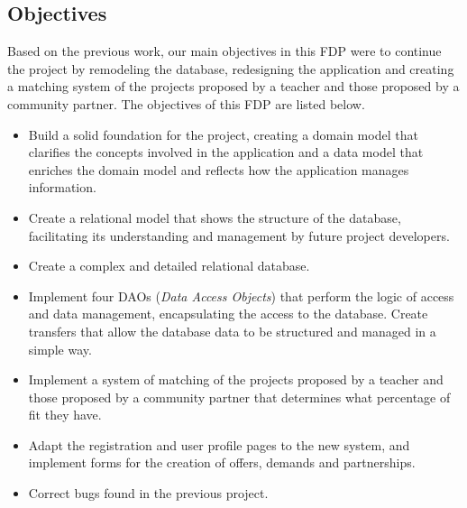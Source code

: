 \documentclass[11pt]{book}
\begin{document}
\begin{itemize}
\section{Objectives}
Based on the previous work, our main objectives in this FDP were to continue the project by remodeling the database, redesigning the application and creating a matching system of the projects proposed by a teacher and those proposed by a community partner.
The objectives of this FDP are listed below.
\begin{itemize} 
	\item Build a solid foundation for the project, creating a domain model that clarifies the concepts involved in the application and a data model that enriches the domain model and reflects how the application manages information.
	\item Create a relational model that shows the structure of the database, facilitating its understanding and management by future project developers.
	\item Create a complex and detailed relational database.
	\item Implement four DAOs (\emph{Data Access Objects}) that perform the logic of access and data management, encapsulating the access to the database. Create transfers that allow the database data to be structured and managed in a simple way.
	\item Implement a system of matching of the projects proposed by a teacher and those proposed by a community partner that determines what percentage of fit they have.
	\item Adapt the registration and user profile pages to the new system, and implement forms for the creation of offers, demands and partnerships.
	\item Correct bugs found in the previous project.	
\end{itemize}


\end{itemize}
\end{document}
